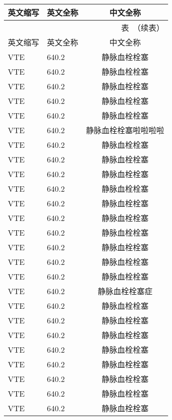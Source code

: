

\begin{longtable}{p{2cm}p{5cm}c}
	\toprule[1.5pt] 英文缩写 & 英文全称 & 中文全称  \\ \midrule[1pt]
	\endfirsthead
	\multicolumn{3}{r}{表~\thetable（续表）}\vspace{0.5em}\\
	\toprule[1.5pt] 英文缩写 & 英文全称 & 中文全称  \\ \midrule[1pt]
	\endhead
	\bottomrule[1.5pt]
	\endfoot
	VTE & 640.2 & 静脉血栓栓塞 \\
	VTE & 640.2 & 静脉血栓栓塞 \\
	VTE & 640.2 & 静脉血栓栓塞 \\
	VTE & 640.2 & 静脉血栓栓塞 \\
	VTE & 640.2 & 静脉血栓栓塞 \\
	VTE & 640.2 & 静脉血栓栓塞啦啦啦啦 \\
	VTE & 640.2 & 静脉血栓栓塞 \\
	VTE & 640.2 & 静脉血栓栓塞 \\
	VTE & 640.2 & 静脉血栓栓塞 \\
	VTE & 640.2 & 静脉血栓栓塞 \\
	VTE & 640.2 & 静脉血栓栓塞 \\
	VTE & 640.2 & 静脉血栓栓塞 \\
	VTE & 640.2 & 静脉血栓栓塞 \\
	VTE & 640.2 & 静脉血栓栓塞 \\
	VTE & 640.2 & 静脉血栓栓塞 \\
	VTE & 640.2 & 静脉血栓栓塞 \\
	VTE & 640.2 & 静脉血栓栓塞症 \\
	VTE & 640.2 & 静脉血栓栓塞 \\
	VTE & 640.2 & 静脉血栓栓塞 \\
	VTE & 640.2 & 静脉血栓栓塞 \\
	VTE & 640.2 & 静脉血栓栓塞 \\
	VTE & 640.2 & 静脉血栓栓塞 \\
	VTE & 640.2 & 静脉血栓栓塞 \\
	VTE & 640.2 & 静脉血栓栓塞 \\
	VTE & 640.2 & 静脉血栓栓塞 \\

\end{longtable}
